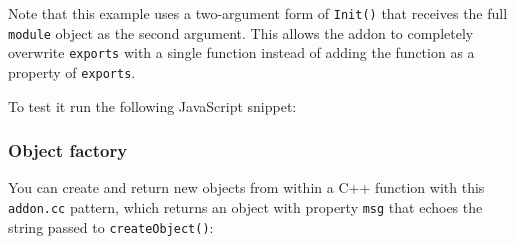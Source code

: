 Note that this example uses a two-argument form of \texttt{Init()} that
receives the full \texttt{module} object as the second argument. This
allows the addon to completely overwrite \texttt{exports} with a single
function instead of adding the function as a property of
\texttt{exports}.

To test it run the following JavaScript snippet:

\begin{Shaded}
\begin{Highlighting}[]
 \NormalTok{(}\NormalTok{);}

\NormalTok{(}
\NormalTok{\});}
\end{Highlighting}
\end{Shaded}

\subsubsection{Object factory}\label{object-factory}

You can create and return new objects from within a C++ function with
this \texttt{addon.cc} pattern, which returns an object with property
\texttt{msg} that echoes the string passed to \texttt{createObject()}:

\begin{Shaded}
\begin{Highlighting}[]
\NormalTok{>}


 \NormalTok{(} 
  \NormalTok{::}\NormalTok{();}

  \NormalTok{::}
  \NormalTok{(}\NormalTok{::}\NormalTok{), args[}\NormalTok{]->}\NormalTok{());}

\NormalTok{\}}

 
\NormalTok{\}}

\end{Highlighting}
\end{Shaded}

